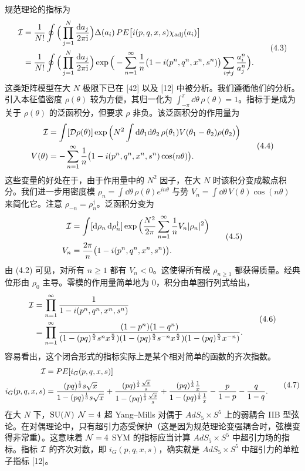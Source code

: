 规范理论的指标为
\[
\begin{aligned}
\mathcal{I}&=\frac{1}{N!}\oint\Big(\prod_{j=1}^{N}\frac{\mathrm{d} a_j}{2\pi\mathrm{i}}\Big)\Delta(a_i)\,PE\big[i(p,q,x,s)\chi_{\operatorname{adj}}(a_i)\big]\\
&=\frac{1}{N!}\oint\Big(\prod_{j=1}^{N}\frac{\mathrm{d} a_j}{2\pi\mathrm{i}}\Big)\exp\Big(-\sum_{n=1}^{\infty}\frac1n\big(1-i(p^n,q^n,x^n,s^n)\big)\sum_{i\neq j}\frac{a_i^n}{a_j^n}\Big) .
\end{aligned}
\tag{4.3}
\]
这类矩阵模型在大 $N$ 极限下已在 [42] 以及 [12] 中被分析。我们遵循他们的分析。引入本征值密度 $\rho(\theta)$ 较为方便，其归一化为 $\int_{-\pi}^{\pi}\dd\theta\,\rho(\theta)=1$。指标于是成为关于 $\rho(\theta)$ 的泛函积分，但要求 $\rho$ 非负。该泛函积分的作用量为
\[
\begin{aligned}
\mathcal{I}&=\int[\mathcal{D}\rho(\theta)]\exp\Big(N^2\int\mathrm{d}\theta_1\mathrm{d}\theta_2\,\rho(\theta_1)V(\theta_1-\theta_2)\rho(\theta_2)\Big)\\
V(\theta)&=-\sum_{n=1}^{\infty}\frac1n\big(1-i(p^n,q^n,x^n,s^n)\cos(n\theta)\big).
\end{aligned}
\tag{4.4}
\]
这些变量的好处在于，由于作用量中的 $N^2$ 因子，在大 $N$ 时该积分变成鞍点积分。我们进一步用密度模 $\rho_n=\int\dd\theta\,\rho(\theta)e^{in\theta}$ 与势 $V_n=\int\dd\theta\,V(\theta)\cos(n\theta)$ 来简化它。注意 $\rho_{-n}=\rho_n^\dagger$。泛函积分变为
\[
\begin{aligned}
\mathcal{I}&=\int[\mathrm{d}\rho_n\,\mathrm{d}\rho_n^\dagger]\exp\Big(\frac{N^2}{2\pi}\sum_{n=1}^{\infty}\frac1n V_n|\rho_n|^2\Big)\\
V_n&=\frac{2\pi}{n}\big(1-i(p^n,q^n,x^n,s^n)\big).
\end{aligned}
\tag{4.5}
\]
由 (4.2) 可见，对所有 $n\ge1$ 都有 $V_n<0$。这使得所有模 $\rho_{n\ge1}$ 都获得质量。经典位形由 $\rho_0$ 主导。零模的作用量简单地为 $0$，积分由单圈行列式给出，
\[
\begin{aligned}
\mathcal{I}&=\prod_{n=1}^{\infty}\frac{1}{1-i(p^n,q^n,x^n,s^n)}\\
&=\prod_{n=1}^{\infty}\frac{(1-p^n)(1-q^n)}{(1-(pq)^{\frac n3}s^n x^{\frac n2})(1-(pq)^{\frac n3}s^{-n}x^{\frac n2})(1-(pq)^{\frac n3}x^{-n})} .
\end{aligned}
\tag{4.6}
\]
容易看出，这个闭合形式的指标实际上是某个相对简单的函数的齐次指数。
\[
\begin{aligned}
\mathcal{I}&=PE[i_G(p,q,x,s)]\\
i_G(p,q,x,s)&=\frac{(pq)^{\frac13}s\sqrt x}{1-(pq)^{\frac13}s\sqrt x}+\frac{(pq)^{\frac13}\frac{\sqrt x}{s}}{1-(pq)^{\frac13}\frac{\sqrt x}{s}}+\frac{(pq)^{\frac13}\frac1x}{1-(pq)^{\frac13}\frac1x}-\frac{p}{1-p}-\frac{q}{1-q} .
\end{aligned}
\tag{4.7}
\]
在大 $N$ 下，$\operatorname{SU}(N)$ $\mathcal{N}=4$ 超 Yang–Mills 对偶于 $AdS_5\times S^5$ 上的弱耦合 IIB 型弦论。在对偶理论中，只有超引力态受保护（这是因为规范理论变强耦合时，弦模变得非常重）。这意味着 $\mathcal{N}=4$ SYM 的指标应当计算 $AdS_5\times S^5$ 中超引力场的指标。指标 $\mathcal{I}$ 的齐次对数，即 $i_G(p,q,x,s)$，确实就是 $AdS_5\times S^5$ 中超引力的单粒子指标 [12]。

